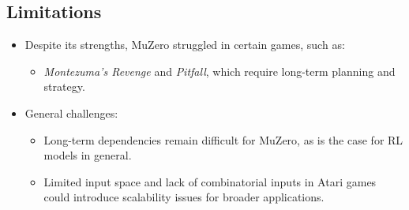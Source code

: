 \documentclass{article}
\begin{document}
\subsection*{Limitations}
\begin{itemize}
    \item Despite its strengths, MuZero struggled in certain games, such as:
    \begin{itemize}
        \item \emph{Montezuma's Revenge} and \emph{Pitfall}, which require long-term planning and strategy.
    \end{itemize}
    \item General challenges:
    \begin{itemize}
        \item Long-term dependencies remain difficult for MuZero, as is the case for RL models in general.
        \item Limited input space and lack of combinatorial inputs in Atari games could introduce scalability issues for broader applications.
    \end{itemize}
\end{itemize}
\end{document}
